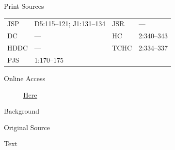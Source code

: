 			\begin{description}
				\item[Print Sources]
			\end{description}

				\begin{tabular}{p{0.5in}p{1in}p{0.5in}p{1in}}
				JSP	 	& D5:115--121; J1:131--134		& JSR 		& --- \\
				DC	 	& --- 				& HC 		& 2:340--343 \\
				HDDC 	& ---				& TCHC 		& 2:334--337 \\
				PJS 	& 1:170--175			& 	 		&  \\ 
				\end{tabular}
			
			\begin{description}
				\item[Online Access] \href{https://www.josephsmithpapers.org/paper-summary/letter-to-william-smith-circa-18-december-1835/1}{Here}
			\end{description}
			
			\begin{description}
				\item[Background]
			\end{description}
			
			
			\begin{description}
				\item[Original Source]
			\end{description}
			
			
			\begin{description}
				\item[Text]
			\end{description}
			
